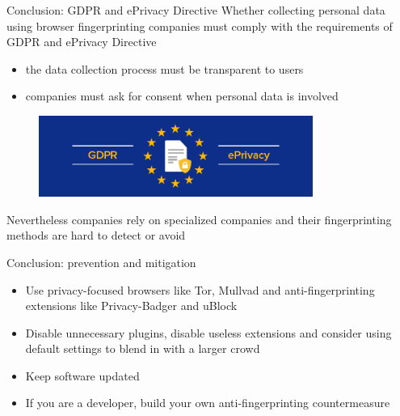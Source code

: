 \begin{frame}{Conclusion: GDPR and ePrivacy Directive}
  Whether collecting personal data using browser fingerprinting companies must comply with the requirements of GDPR and ePrivacy Directive
  \begin{itemize}
    \item the data collection process must be transparent to users
    \item companies must ask for consent when personal data is involved
  \end{itemize}
  \begin{figure}
    \centering
    \includegraphics[width=0.8\textwidth]{images/privacy.png}
  \end{figure}
  Nevertheless companies rely on specialized companies and their fingerprinting methods are hard to detect or avoid
\end{frame}

\begin{frame}{Conclusion: prevention and mitigation}
  \begin{itemize}
    \item Use privacy-focused browsers like Tor, Mullvad and anti-fingerprinting extensions like Privacy-Badger and uBlock
          \vspace{0.5cm}
    \item Disable unnecessary plugins, disable useless extensions and consider using default settings to blend in with a larger crowd
          \vspace{0.5cm}
    \item Keep software updated
          \vspace{0.5cm}
    \item If you are a developer, build your own anti-fingerprinting countermeasure
  \end{itemize}
\end{frame}